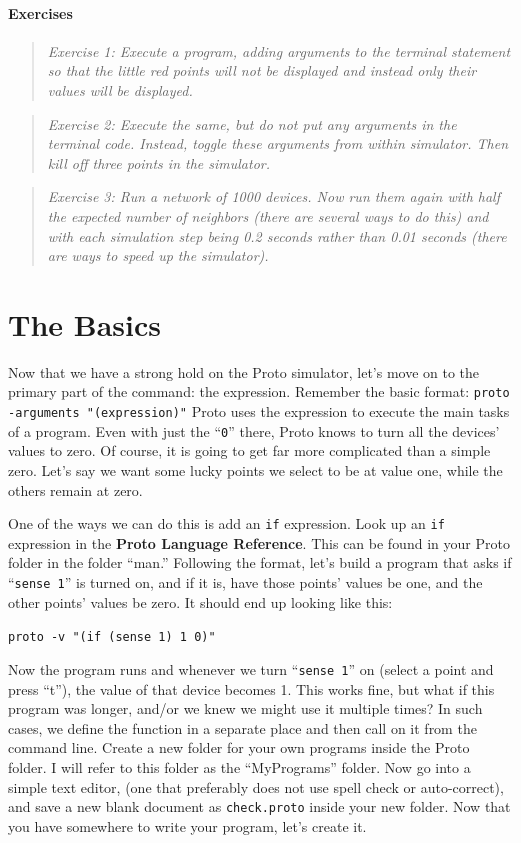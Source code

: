 \documentclass{article}
\newcommand\code[1]{\begin{center}\var{#1}\end{center}}
\newcommand\problem[1]{\begin{quote}{\em #1}\end{quote}}
\newcommand\var[1]{{\tt #1}}
\newcommand\qvar[1]{``{\tt #1}''}
\begin{document}
\paragraph{Exercises}

\problem{Exercise 1: Execute a program, adding arguments to the
  terminal statement so that the little red points will not be
  displayed and instead only their values will be displayed.}

\problem{Exercise 2: Execute the same, but do not put any arguments in
  the terminal code. Instead, toggle these arguments from within
  simulator. Then kill off three points in the simulator.}

\problem{Exercise 3: Run a network of 1000 devices. Now run them again
  with half the expected number of neighbors (there are several ways
  to do this) and with each simulation step being 0.2 seconds rather
  than 0.01 seconds (there are ways to speed up the simulator).}

\section{The Basics}

Now that we have a strong hold on the Proto simulator, let's move on to
the primary part of the command: the expression. Remember the basic
format: \var{proto -arguments "(expression)"} Proto uses the
expression to execute the main tasks of a program.  Even with just the
\qvar{0} there, Proto knows to turn all the devices' values to zero.
Of course, it is going to get far more complicated than a simple zero.
Let's say we want some lucky points we select to be at value one,
while the others remain at zero.

One of the ways we can do this is add an \var{if} expression.  Look up
an \var{if} expression in the {\bf Proto Language Reference}.  This
can be found in your Proto folder in the folder ``man.''  Following
the format, let's build a program that asks if \qvar{sense 1} is
turned on, and if it is, have those points' values be one, and the
other points' values be zero.  It should end up looking like this:

\code{proto -v "(if (sense 1) 1 0)"}

Now the program runs and whenever we turn \qvar{sense 1} on (select a
point and press ``t''), the value of that device becomes 1.  This
works fine, but what if this program was longer, and/or we knew we
might use it multiple times?  In such cases, we define the function in
a separate place and then call on it from the command line.  Create a
new folder for your own programs inside the Proto folder.  I will
refer to this folder as the ``MyPrograms'' folder.  Now go into a
simple text editor, (one that preferably does not use spell check or
auto-correct), and save a new blank document as \var{check.proto}
inside your new folder.  Now that you have somewhere to write your
program, let's create it.
\end{document}
